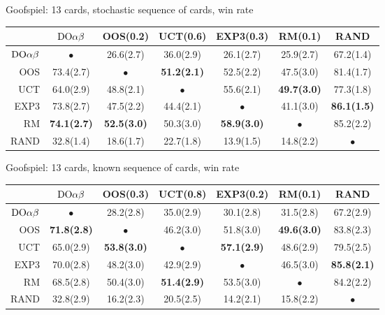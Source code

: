 \begin{table}
\centering
\begin{scriptsize}

Goofspiel: 13 cards, stochastic sequence of cards, win rate
\begin{tabular}{|r|cccccc|}\hline
&$\textrm{DO}\alpha\beta$&OOS(0.2)&UCT(0.6)&EXP3(0.3)&RM(0.1)&RAND\\\hline
$\textrm{DO}\alpha\beta$&$\bullet$&26.6(2.7)&36.0(2.9)&26.1(2.7)&25.9(2.7)&67.2(1.4)\\
OOS&73.4(2.7)&$\bullet$&\textbf{51.2(2.1)}&52.5(2.2)&47.5(3.0)&81.4(1.7)\\
UCT&64.0(2.9)&48.8(2.1)&$\bullet$&55.6(2.1)&\textbf{49.7(3.0)}&77.3(1.8)\\
EXP3&73.8(2.7)&47.5(2.2)&44.4(2.1)&$\bullet$&41.1(3.0)&\textbf{86.1(1.5)}\\
RM&\textbf{74.1(2.7)}&\textbf{52.5(3.0)}&50.3(3.0)&\textbf{58.9(3.0)}&$\bullet$&85.2(2.2)\\
RAND&32.8(1.4)&18.6(1.7)&22.7(1.8)&13.9(1.5)&14.8(2.2)&$\bullet$\\
\hline
\end{tabular}

Goofspiel: 13 cards, known sequence of cards, win rate
\begin{tabular}{|r|cccccc|}\hline
&$\textrm{DO}\alpha\beta$&OOS(0.3)&UCT(0.8)&EXP3(0.2)&RM(0.1)&RAND\\\hline
$\textrm{DO}\alpha\beta$&$\bullet$&28.2(2.8)&35.0(2.9)&30.1(2.8)&31.5(2.8)&67.2(2.9)\\
OOS&\textbf{71.8(2.8)}&$\bullet$&46.2(3.0)&51.8(3.0)&\textbf{49.6(3.0)}&83.8(2.3)\\
UCT&65.0(2.9)&\textbf{53.8(3.0)}&$\bullet$&\textbf{57.1(2.9)}&48.6(2.9)&79.5(2.5)\\
EXP3&70.0(2.8)&48.2(3.0)&42.9(2.9)&$\bullet$&46.5(3.0)&\textbf{85.8(2.1)}\\
RM&68.5(2.8)&50.4(3.0)&\textbf{51.4(2.9)}&53.5(3.0)&$\bullet$&84.2(2.2)\\
RAND&32.8(2.9)&16.2(2.3)&20.5(2.5)&14.2(2.1)&15.8(2.2)&$\bullet$\\
\hline
\end{tabular}


\end{scriptsize}
\end{table}
